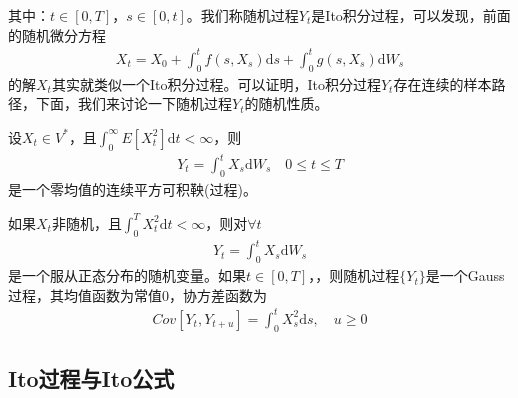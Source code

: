             其中：$t\in [0,T]$，$s\in [0,t]$。我们称随机过程$Y_t$是Ito积分过程，可以发现，前面的随机微分方程
            \begin{align*}
                X_t = X_0+\int_0^t f(s,X_s) \mathrm{d}s+ \int_0^t g(s,X_s) \mathrm{d}W_s
            \end{align*}
            的解$X_t$其实就类似一个Ito积分过程。可以证明，Ito积分过程$Y_t$存在连续的样本路径，下面，我们来讨论一下随机过程$Y_t$的随机性质。
            \begin{theorem}[鞅性质]
            设$X_t\in V^*$，且$\int_0^\infty E[X_t^2]\mathrm{d}t < \infty$，则
            \begin{align*}
                Y_t = \int_0^t X_s\mathrm{d}W_s \quad 0 \leqslant t \leqslant T
            \end{align*}
            是一个零均值的连续平方可积鞅(过程)。
            \end{theorem}
            \begin{definition}[Gauss过程]
            如果$X_t$非随机，且$\int_0^T X_t^2 \mathrm{d}t < \infty$，则对$\forall t$
            \begin{align*}
                Y_t = \int_0^t X_s\mathrm{d}W_s
            \end{align*}
            是一个服从正态分布的随机变量。如果$t\in [0,T]$，，则随机过程$\{Y_t\}$是一个Gauss过程，其均值函数为常值$0$，协方差函数为
            \begin{align*}
                Cov[Y_t,Y_{t+u}] = \int_0^t X_s^2 \mathrm{d}s ,\quad u \geqslant 0
            \end{align*}
            \end{definition}

    \subsection{Ito过程与Ito公式}
        \label{subsec:Ito过程与Ito公式}
